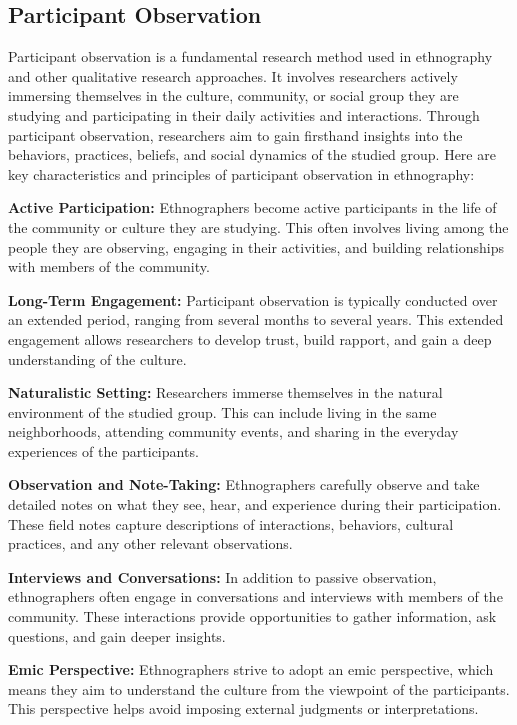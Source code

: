 \documentclass[
  b5paper]{book}
\begin{document}
\hypertarget{participant-observation}{%
\subsection*{Participant Observation}\label{participant-observation}}

Participant observation is a fundamental research method used in ethnography and other qualitative research approaches. It involves researchers actively immersing themselves in the culture, community, or social group they are studying and participating in their daily activities and interactions. Through participant observation, researchers aim to gain firsthand insights into the behaviors, practices, beliefs, and social dynamics of the studied group. Here are key characteristics and principles of participant observation in ethnography:

\textbf{Active Participation:} Ethnographers become active participants in the life of the community or culture they are studying. This often involves living among the people they are observing, engaging in their activities, and building relationships with members of the community.

\textbf{Long-Term Engagement:} Participant observation is typically conducted over an extended period, ranging from several months to several years. This extended engagement allows researchers to develop trust, build rapport, and gain a deep understanding of the culture.

\textbf{Naturalistic Setting:} Researchers immerse themselves in the natural environment of the studied group. This can include living in the same neighborhoods, attending community events, and sharing in the everyday experiences of the participants.

\textbf{Observation and Note-Taking:} Ethnographers carefully observe and take detailed notes on what they see, hear, and experience during their participation. These field notes capture descriptions of interactions, behaviors, cultural practices, and any other relevant observations.

\textbf{Interviews and Conversations:} In addition to passive observation, ethnographers often engage in conversations and interviews with members of the community. These interactions provide opportunities to gather information, ask questions, and gain deeper insights.

\textbf{Emic Perspective:} Ethnographers strive to adopt an emic perspective, which means they aim to understand the culture from the viewpoint of the participants. This perspective helps avoid imposing external judgments or interpretations.
\end{document}
